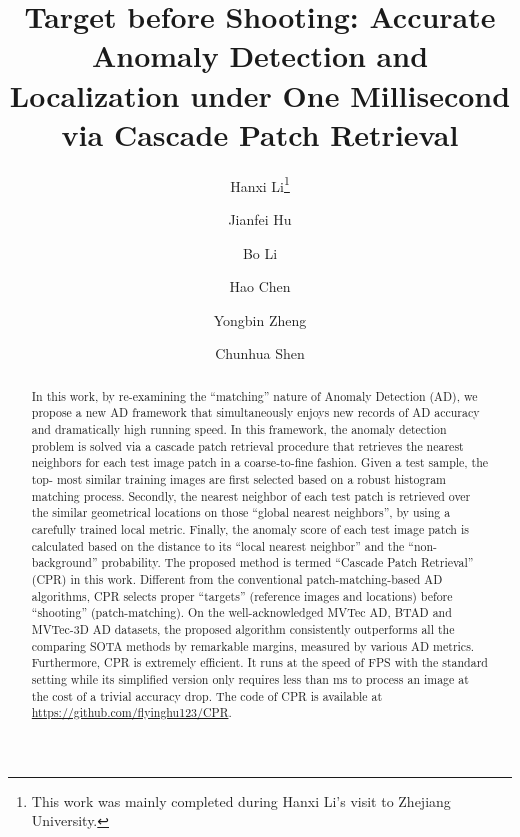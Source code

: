 \documentclass[lettersize,journal]{IEEEtran}
\begin{document}
\title{Target before Shooting: Accurate Anomaly Detection and Localization under One
  Millisecond via Cascade Patch Retrieval}

\author[1,2,]{Hanxi Li\thanks{This work was mainly completed during Hanxi Li's visit to
    Zhejiang University.}}
\author[1,]{Jianfei Hu}
\author[3,]{Bo Li}
\author[2]{Hao Chen}
\author[4,]{Yongbin Zheng}
\author[2,]{Chunhua Shen}


\maketitle

\begin{abstract}

In this work, by re-examining the ``matching'' nature of Anomaly Detection (AD), we propose a
  new AD framework that simultaneously enjoys new records of AD accuracy and dramatically high running speed. In this framework, the anomaly detection problem is solved via a
  cascade patch retrieval procedure that retrieves the nearest neighbors for each test
  image patch in a coarse-to-fine fashion.
Given a test sample, the top- most similar training images are first selected
  based on a robust histogram matching process. Secondly, the
  nearest neighbor of each test patch is retrieved over the similar geometrical locations on
  those ``global nearest neighbors'', by using a carefully trained local metric. Finally,
  the anomaly score of each test image patch is calculated based on the distance to its
  ``local nearest neighbor'' and the ``non-background'' probability. The proposed method is termed ``Cascade Patch Retrieval'' (CPR) in this work. Different from the conventional
  patch-matching-based AD algorithms, CPR selects proper ``targets'' (reference images and locations)
  before ``shooting'' (patch-matching).
On the well-acknowledged MVTec AD, BTAD and MVTec-3D AD datasets, the proposed
  algorithm consistently outperforms all the comparing SOTA methods by remarkable margins, measured by various AD metrics.
Furthermore, CPR is extremely efficient. It runs at the
  speed of  FPS with the standard setting while its simplified version only
  requires less than  ms to process an image at the cost of a trivial accuracy drop. The code of CPR is available at \href{https://github.com/flyinghu123/CPR}{https://github.com/flyinghu123/CPR}.

\end{abstract}
\end{document}
